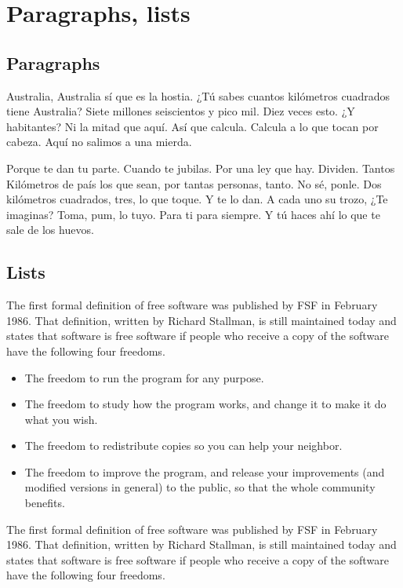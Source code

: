 

\section{Paragraphs, lists}

\subsection{Paragraphs}

Australia, Australia sí que es la hostia. ¿Tú sabes cuantos kilómetros cuadrados tiene Australia? Siete millones seiscientos y pico mil. Diez veces esto. ¿Y habitantes? Ni la mitad que aquí. Así que calcula. Calcula a lo que tocan por cabeza. Aquí no salimos a una mierda.

Porque te dan tu parte. Cuando te jubilas. Por una ley que hay. Dividen. Tantos Kilómetros de país los que sean, por tantas personas, tanto. No sé, ponle. Dos kilómetros cuadrados, tres, lo que toque. Y te lo dan. A cada uno su trozo, ¿Te imaginas? Toma, pum, lo tuyo. Para ti para siempre. Y tú haces ahí lo que te sale de los huevos.

\subsection{Lists}

The first formal definition of free software was published by FSF in February 1986. That definition, written by Richard Stallman, is still maintained today and states that software is free software if people who receive a copy of the software have the following four freedoms.

\begin{itemize}
  \item The freedom to run the program for any purpose.
  \item The freedom to study how the program works, and change it to make it do what you wish.
  \item The freedom to redistribute copies so you can help your neighbor.
  \item The freedom to improve the program, and release your improvements (and modified versions in general) to the public, so that the whole community benefits.
\end{itemize}

The first formal definition of free software was published by FSF in February 1986. That definition, written by Richard Stallman, is still maintained today and states that software is free software if people who receive a copy of the software have the following four freedoms.

